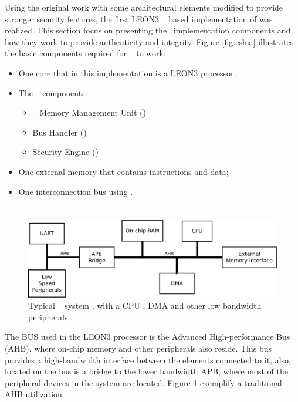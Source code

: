 Using the original work with some architectural elements modified to provide stronger security features, the first LEON3 \fpga~ based implementation of \cshia was realized. This section focus on presenting the \cshia~implementation components and how they work to provide authenticity and integrity. Figure \ref{fig:cshia} illustrates the basic components required for \cshia~ to work: 
\begin{itemize}
    \item One core that in this implementation is a LEON3 processor;
    \item The \cshia~ components:
    \begin{itemize}
        \item \ptag~ Memory Management Unit (\pmmu)
        \item Bus Handler (\handler)
        \item Security Engine (\seceng) 
    \end{itemize}
    \item One external memory that contains instructions and data;
    \item One interconnection bus using \amba.
\end{itemize} 


\section{\amba}
\label{sec:amba2}
\begin{figure}[!ht]
    \centering
    \includegraphics[width=1\textwidth]{figures/pdf/typical_amba_new.pdf}
    \caption{Typical \amba~ system , with a CPU , DMA and other low bandwidth peripherals. }
    \label{fig:general}
\end{figure}

The BUS used in the LEON3 processor is the Advanced High-performance Bus (AHB), where on-chip memory and other peripherals also reside. This bus provides a high-bandwidth interface between the elements connected to it, also, located on the bus is a bridge to the lower bandwidth APB, where most of the peripheral devices in the system are located. Figure \ref{fig:general} exemplify a traditional AHB utilization.

